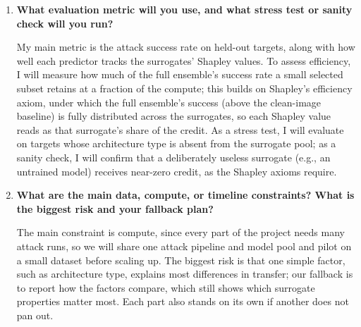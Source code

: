 \documentclass[11pt]{article}
\begin{document}
\begin{enumerate}[leftmargin=*, itemsep=8pt]
\item \textbf{What evaluation metric will you use, and what stress test or sanity check will you run?}

My main metric is the attack success rate on held-out targets, along with how well each predictor tracks the surrogates' Shapley values. To assess efficiency, I will measure how much of the full ensemble's success rate a small selected subset retains at a fraction of the compute; this builds on Shapley's efficiency axiom, under which the full ensemble's success (above the clean-image baseline) is fully distributed across the surrogates, so each Shapley value reads as that surrogate's share of the credit. As a stress test, I will evaluate on targets whose architecture type is absent from the surrogate pool; as a sanity check, I will confirm that a deliberately useless surrogate (e.g., an untrained model) receives near-zero credit, as the Shapley axioms require.

\item \textbf{What are the main data, compute, or timeline constraints? What is the biggest risk and your fallback plan?}

The main constraint is compute, since every part of the project needs many attack runs, so we will share one attack pipeline and model pool and pilot on a small dataset before scaling up. The biggest risk is that one simple factor, such as architecture type, explains most differences in transfer; our fallback is to report how the factors compare, which still shows which surrogate properties matter most. Each part also stands on its own if another does not pan out.

\end{enumerate}
\end{document}
